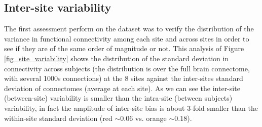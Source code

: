 \documentclass[authoryear]{elsarticle}
\begin{document}

\subsection{Inter-site variability}
The first assessment perform on the dataset was to verify the distribution of the variance in functional connectivity among each site and across sites in order to see if they are of the same order of magnitude or not. This analysis of Figure \ref{fig_site_variability} shows the distribution of the standard deviation in connectivity across subjects (the distribution is over the full brain connectome, with several 1000s connections) at the 8 sites against the inter-sites standard deviation of connectomes (average at each site). As we can see the inter-site (between-site) variability is smaller than the intra-site (between subjects) variability, in fact the amplitude of inter-site bias is about 3-fold smaller than the within-site standard deviation (red $\sim 0.06$ vs. orange $\sim 0.18$).
\end{document}
